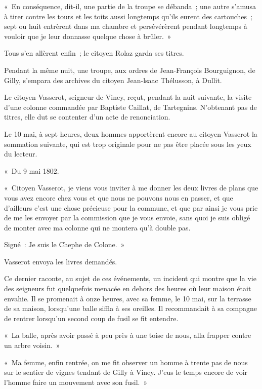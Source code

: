 \documentclass[french,twoside]{book} %
\newenvironment{quoteblock}%
  {\begin{quoting}}
  {\end{quoting}}
\newenvironment{quotebar}{%
    \def\FrameCommand{{\color{rubric!10!}\vrule width 0.5em} \hspace{0.9em}}%
    \def\OuterFrameSep{\itemsep} %
    \MakeFramed {\advance\hsize-\width \FrameRestore}
  }%
  {%
    \endMakeFramed
  }
\renewenvironment{quoteblock}%
  {%
    \savenotes
    \setstretch{0.9}
    \normalfont
    \begin{quotebar}
  }
  {%
    \end{quotebar}
    \spewnotes
  }
\begin{document}
\begin{quoteblock}
 \noindent « En conséquence, dit-il, une partie de la troupe se débanda ; une autre s’amusa à tirer contre les tours et les toits aussi longtemps qu’ils eurent des cartouches ; sept ou huit entrèrent dans ma chambre et persévérèrent pendant longtemps à vouloir que je leur donnasse quelque chose à brûler. »
 \end{quoteblock}

\noindent Tous s’en allèrent enfin ; le citoyen Rolaz garda ses titres.\par
Pendant la même nuit, une troupe, aux ordres de Jean-François Bourguignon, de Gilly, s’empara des archives du citoyen Jean-lsaac Thélusson, à Dullit.\par
Le citoyen Vasserot, seigneur de Viney, reçut, pendant la nuit suivante, la visite d’une colonne commandée par Baptiste Caillat, de Tartegnins. N’obtenant pas de titres, elle dut se contenter d’un acte de renonciation.\par
Le 10 mai, à sept heures, deux hommes apportèrent encore au citoyen Vasserot la sommation suivante, qui est trop originale pour ne pas être placée sous les yeux du lecteur.\par

\begin{quoteblock}
 \noindent « Du 9 mai 1802.\par
 « Citoyen Vasserot, je viens vous inviter à me donner les deux livres de plans que vous avez encore chez vous et que nous ne pouvons nous en passer, et que d’ailleurs c’est une chose précieuse pour la commune, et que par ainsi je vous prie de me les envoyer par la commission que je vous envoie, sans quoi je suis obligé de monter avec ma colonne qui ne montera qu’à double pas.\par
 Signé : Je suis le Chephe de Colone. »
 \end{quoteblock}

\noindent Vasserot envoya les livres demandés.\par
Ce dernier raconte, au sujet de ces événements, un incident qui montre que la vie des seigneurs fut quelquefois menacée en dehors des heures où leur maison était envahie. Il se promenait à onze heures, avec sa femme, le 10 mai, sur la terrasse de sa maison, lorsqu’une balle siffla à ses oreilles. Il recommandait à sa compagne de rentrer lorsqu’un second coup de fusil se fit entendre.\par

\begin{quoteblock}
 \noindent « La balle, après avoir passé à peu près à une toise de nous, alla frapper contre un arbre voisin. »\par
 « Ma femme, enfin rentrée, on me fit observer un homme à trente pas de nous sur le sentier de vignes tendant de Gilly à Viney. J’eus le temps encore de voir l’homme faire un mouvement avec son fusil. »
 \end{quoteblock}
\end{document}
